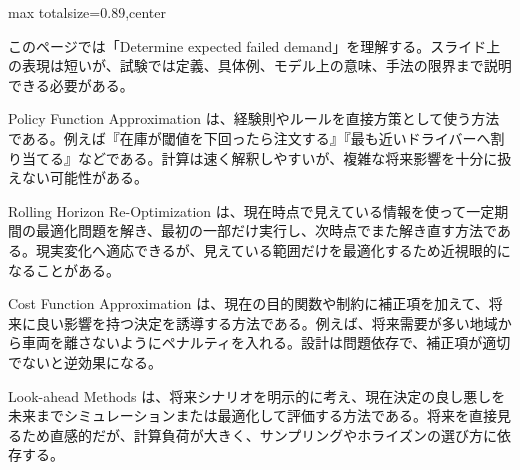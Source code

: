 \begin{minipage}[t]{0.58\textwidth}
\begin{adjustbox}{max totalsize={\textwidth}{0.89\textheight},center}
\begin{minipage}{\textwidth}\scriptsize
{}このページでは「Determine expected failed demand」を理解する。スライド上の表現は短いが、試験では定義、具体例、モデル上の意味、手法の限界まで説明できる必要がある。\par
Policy Function Approximation は、経験則やルールを直接方策として使う方法である。例えば『在庫が閾値を下回ったら注文する』『最も近いドライバーへ割り当てる』などである。計算は速く解釈しやすいが、複雑な将来影響を十分に扱えない可能性がある。\par
Rolling Horizon Re-Optimization は、現在時点で見えている情報を使って一定期間の最適化問題を解き、最初の一部だけ実行し、次時点でまた解き直す方法である。現実変化へ適応できるが、見えている範囲だけを最適化するため近視眼的になることがある。\par
Cost Function Approximation は、現在の目的関数や制約に補正項を加えて、将来に良い影響を持つ決定を誘導する方法である。例えば、将来需要が多い地域から車両を離さないようにペナルティを入れる。設計は問題依存で、補正項が適切でないと逆効果になる。\par
Look-ahead Methods は、将来シナリオを明示的に考え、現在決定の良し悪しを未来までシミュレーションまたは最適化して評価する方法である。将来を直接見るため直感的だが、計算負荷が大きく、サンプリングやホライズンの選び方に依存する。\par

\end{minipage}
\end{adjustbox}
\end{minipage}
